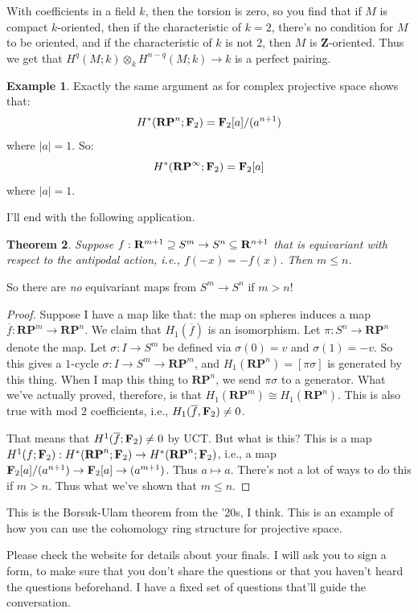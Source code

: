 \documentclass{amsart}
\theoremstyle{theorem}
\newtheorem{theorem}{Theorem}[section]
\theoremstyle{definition}
\newtheorem{example}[theorem]{Example}
\newcommand{\RP}{\mathbf{RP}}
\newcommand{\Z}{\mathbf Z}
\begin{document}
With coefficients in a field $k$, then the torsion is zero, so you find that if $M$ is compact $k$-oriented, then if the characteristic of $k=2$, there's no condition for $M$ to be oriented, and if the characteristic of $k$ is not $2$, then $M$ is $\Z$-oriented. Thus we get that $H^q(M;k)\otimes_k H^{n-q}(M;k)\to k$ is a perfect pairing.
\begin{example}
Exactly the same argument as for complex projective space shows that:
\begin{equation*}
H^\ast(\RP^n;\FF_2)=\FF_2[a]/(a^{n+1})
\end{equation*}
where $|a|=1$. So:
\begin{equation}
H^\ast(\RP^\infty;\FF_2)=\FF_2[a]
\end{equation}
where $|a|=1$.
\end{example}
I'll end with the following application.
\begin{theorem}
Suppose $f:\mathbf R^{m+1}\supseteq S^m\to S^n\subseteq \mathbf R^{n+1}$ that is equivariant with respect to the antipodal action, i.e., $f(-x)=-f(x)$. Then $m\leq n$.
\end{theorem}
So there are \emph{no} equivariant maps from $S^m\to S^n$ if $m>n$!
\begin{proof}
Suppose I have a map like that: the map on spheres induces a map $\overline{f}:\RP^m\to\RP^n$. We claim that $H_1(\overline{f})$ is an isomorphism. Let $\pi:S^n\to\RP^n$ denote the map. Let $\sigma:I\to S^m$ be defined via $\sigma(0)=v$ and $\sigma(1)=-v$. So this gives a $1$-cycle $\sigma:I\to S^m\to\RP^m$, and $H_1(\RP^n)=[\pi\sigma]$ is generated by this thing. When I map this thing to $\RP^n$, we send $\pi\sigma$ to a generator. What we've actually proved, therefore, is that $H_1(\RP^m)\cong H_1(\RP^n)$. This is also true with mod $2$ coefficients, i.e., $H_1(\overline{f},\mathbf F_2)\neq 0$.

That means that $H^1(\overline{f};\mathbf F_2)\neq 0$ by UCT. But what is this? This is a map $H^1(f;\FF_2):H^\ast(\RP^n;\FF_2)\to H^\ast(\RP^n;\FF_2)$, i.e., a map $\mathbf F_2[a]/(a^{n+1})\to \mathbf F_2[a]\to(a^{m+1})$. Thus $a\mapsto a$. There's not a lot of ways to do this if $m>n$. Thus what we've shown that $m\leq n$.
\end{proof}
This is the Borsuk-Ulam theorem from the '20s, I think. This is an example of how you can use the cohomology ring structure for projective space.

Please check the website for details about your finals. I will ask you to sign a form, to make sure that you don't share the questions or that you haven't heard the questions beforehand. I have a fixed set of questions that'll guide the conversation.
\end{document}
